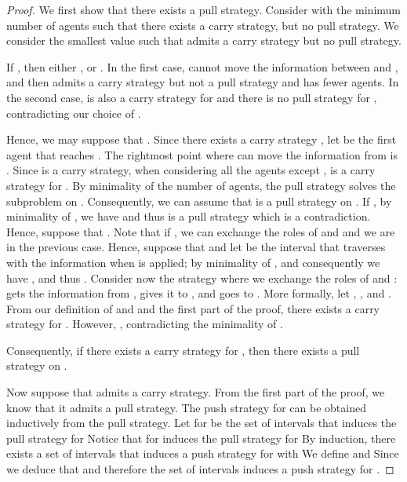 \documentclass{article}
\newcommand\subproblem{carry\xspace}
\begin{document}
\begin{proof}
We first show that there exists a pull strategy. 
Consider  with the minimum number of
agents such that there exists a \subproblem strategy, but no
pull strategy. We consider the smallest value  such that 
admits a \subproblem strategy but no pull strategy.

If , then either , or . In the
first case,  cannot move the information between  and , and
then  admits a carry strategy but not a pull strategy and has fewer agents. In the
second case,  is also a \subproblem strategy for  and there is no pull strategy for ,
contradicting our choice of .

Hence, we may suppose that . Since there exists a carry strategy , let  be the first agent that
reaches .  The rightmost point where  can move the information
from  is . Since  is a \subproblem strategy,
when considering all the agents except ,  is a \subproblem
strategy for . By minimality of the
number of agents, the pull strategy solves the subproblem on
.  Consequently, we can assume that
 is a pull strategy on .  If , by minimality of , we have  and thus  is a pull
strategy which is a contradiction. Hence, suppose that . Note that if , we can exchange the roles of
 and  and we are in the previous case.
Hence, suppose that  and let  be the interval
that  traverses with the information when  is applied; by
minimality of ,  and consequently we have , and thus .
Consider now the strategy where we exchange the roles of  and
:  gets the information from , gives it to , and
 goes to . More formally, let , ,  and . From
our definition of  and  and the first part of the proof,
there exists a \subproblem strategy for
. However, , contradicting the minimality of .

Consequently, if there exists a carry strategy  for , then there exists
a pull strategy on
. 

\medskip

Now suppose that  admits a \subproblem strategy. 
From the first part of the proof, we know that it admits a pull strategy.
The push strategy for  can
be obtained inductively from the pull strategy. 
Let  for  be the set 
of intervals that induces the pull strategy for 
 Notice that  for  
induces the pull strategy for  
By induction, there exists a set of intervals  that 
induces a push strategy for  
with  We define  
and  Since  
we deduce that  and therefore the set of intervals
 induces a push strategy for 
.  
\end{proof}
\end{document}
